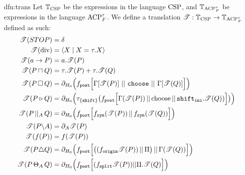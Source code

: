 \documentclass[../hons_project.tex]{subfiles}
\begin{document}
\newpage
\begin{dfn}{dfn:trans}{}
	Let $\mathbb{T}_{\mathrm{CSP}}$ be the expressions in the language $\mathrm{CSP}$, and $\mathbb{T}_{\mathrm{ACP}_{F}^{\tau}}$ be expressions in the language $\mathrm{ACP}_{F}^{\tau}$. We define a translation $\mathscr{T} : \mathbb{T}_{\mathrm{CSP}} \to \mathbb{T}_{\mathrm{ACP}_{F}^{\tau}}$ defined as such:
	\begin{align*}
		\mathscr{T}(STOP)           & = \delta                                                                                                                                                                                     \\
		\mathscr{T}(\mathrm{div})   & = \langle X \mid X = \tau.X \rangle                                                                                                                                                          \\
		\mathscr{T}(a \to P)        & = a.\mathscr{T}(P)                                                                                                                                                                                \\
		\mathscr{T}(P \sqcap Q) & = \tau.\mathscr{T}(P) + \tau.\mathscr{T}(Q)                                                                                                                                                            \\
		\mathscr{T}(P \,\square\, Q) & = \partial_{H_{0}}\Bigl(f_{\mathtt{post}}\Bigl[\Gamma[\mathscr{T}(P)]\, \,\vert\vert\, \,\mathtt{choose}\, \,\vert\vert\, \,\Gamma[\mathscr{T}(Q)]\Bigl]\Bigr)                                                               \\
		\mathscr{T}(P \triangleright Q)   & = \partial_{H_{0}}\Bigl(\tau_{\{\mathtt{shift}\}}\bigl(f_{\mathtt{post}}\Bigl[ \Gamma(\mathscr{T}(P)) \,\vert\vert\, \mathrm{choose} \,\vert\vert\, \mathtt{shift}_{\mathtt{ini}} . \mathscr{T}(Q)) \Bigr]\bigr)\Bigr) \\
		\mathscr{T}(P \,\vert\vert_{A}\, Q)     & = \partial_{H_{0}}\Bigl(f_{\mathtt{post}}\Bigl[f_{\mathtt{syn}}(\mathscr{T}(P)) \,\vert\vert\, f_{\mathtt{syn}}(\mathscr{T}(Q))\Bigr]\Bigr)                                                                                      \\
		\mathscr{T}(P \backslash A) & = \partial_{A}{\mathscr{T}(P)}                                                                                                                                                                    \\
		\mathscr{T}(f(P))           & = f(\mathscr{T}(P))                                                                                                                                                                               \\
		\mathscr{T}(P \triangle Q) & = \partial_{H_{0}}\Bigl(f_{\mathtt{post}}\Bigl[ \bigl((f_{\mathtt{origin}}\mathscr{T}(P)) \,\vert\vert\, \Pi\bigr) \,\vert\vert\, \Gamma(\mathscr{T}(Q)) \Bigr]\Bigr)                                                              \\
		\mathscr{T}(P \,\Theta_{A}\, Q)     & = \partial_{H_{0}}\Bigl(f_{\mathtt{post}} \Bigl[ (f_{\mathtt{split}} \mathscr{T}(P)) | | \Pi.\mathscr{T}(Q) \Bigr]\Bigr)
	\end{align*}
\end{dfn}
\end{document}
